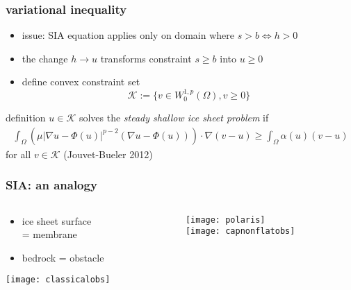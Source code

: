 \documentclass{beamer}
\newcommand{\Kcal}{\mathcal{K}}
\begin{document}
\begin{frame}
  \frametitle{ variational inequality } 

\begin{itemize}
\item issue: SIA equation applies only on domain where $s>b \iff h > 0$
\item the change $h \to u$ transforms  constraint $s \ge b$ into $u \ge 0$
\item define convex constraint set
  $$\Kcal := \{ v \in W^{1,p}_0 (\Omega), v \ge 0 \}$$
\end{itemize}

\begin{block}{definition} 
$u \in \Kcal$ solves the \emph{steady shallow ice sheet problem} if
\begin{align*}
\int_{\Omega}    \left( \mu  | \nabla u - \Phi(u) |^{p-2} 
( \nabla u - \Phi(u) )    \right)  \cdot \nabla ( v - u )  
\ge \int_{\Omega} \alpha(u) (  v -  u ) 
\end{align*}
for all $v \in \Kcal$ \hfill \scriptsize (Jouvet-Bueler 2012)
\end{block}
\end{frame}


\begin{frame}
  \frametitle{SIA: an analogy}

\begin{columns}
\begin{column}{0.35\textwidth}
\begin{itemize}
\item ice sheet surface \\ = \alert{membrane}
\item bedrock = \alert{obstacle}
\end{itemize}
\vfill
\begin{center}
\texttt{[image: classicalobs]}
\end{center}
\end{column}
\begin{column}{0.65\textwidth}
\begin{center}
\texttt{[image: polaris]} \\
\texttt{[image: capnonflatobs]}
\end{center}
\end{column}
\end{columns}
\end{frame}
\end{document}
